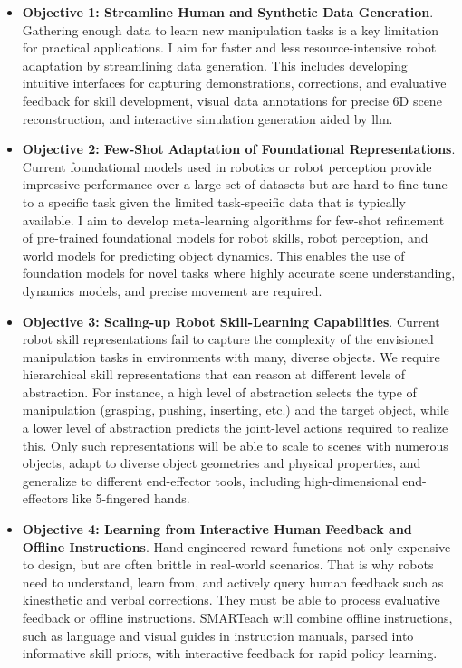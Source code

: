 \documentclass{erc-B2}
\begin{document}
\begin{itemize}[leftmargin=*]
    \item \textbf{Objective 1: Streamline Human and Synthetic Data Generation}. Gathering enough data to learn new manipulation tasks is a key limitation for practical applications. I aim for faster and less resource-intensive robot adaptation by streamlining data generation. This includes developing intuitive interfaces for capturing demonstrations, corrections, and evaluative feedback for skill development, visual data annotations for precise 6D scene reconstruction, and interactive simulation generation aided by \gls*{llm}.
    
    \item \textbf{Objective 2: Few-Shot Adaptation of Foundational Representations}. Current foundational models used in robotics \cite{rt12022arxiv,rtx2023arxiv} or robot perception \cite{SAM} provide impressive performance over a large set of datasets but are hard to fine-tune to a specific task given the limited task-specific data that is typically available. I aim to develop meta-learning algorithms for few-shot refinement of pre-trained foundational models for robot skills, robot perception, and world models for predicting object dynamics. This enables the use of foundation models for novel tasks where highly accurate scene understanding, dynamics models, and precise movement are required.

    \item \textbf{Objective 3: Scaling-up Robot Skill-Learning Capabilities}. Current robot skill representations fail to capture the complexity of the envisioned manipulation tasks in environments with many, diverse objects. We require hierarchical skill representations that can reason at different levels of abstraction. For instance, a high level of abstraction selects the type of manipulation (grasping, pushing, inserting, etc.) and the target object, while a lower level of abstraction predicts the joint-level actions required to realize this. Only such representations will be able to scale to scenes with numerous objects, adapt to diverse object geometries and physical properties, and generalize to different end-effector tools, including high-dimensional end-effectors like 5-fingered hands.

    \item \textbf{Objective 4: Learning from Interactive Human Feedback and Offline Instructions}. Hand-engineered reward functions not only expensive to design, but are often brittle in real-world scenarios. That is why robots need to understand, learn from, and actively query human feedback such as kinesthetic and verbal corrections. They must be able to process evaluative feedback or offline instructions. SMARTeach will combine offline instructions, such as language and visual guides in instruction manuals, parsed into informative skill priors, with interactive feedback for rapid policy learning. 
\end{itemize}
\end{document}
